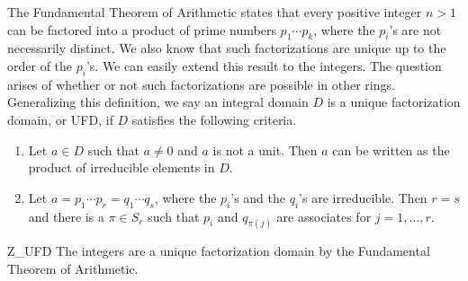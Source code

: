 
 
 
The Fundamental Theorem of Arithmetic states that every positive
integer $n >1$ can be factored into a product of prime numbers $p_1
\cdots p_k$, where the $p_i$'s are not necessarily distinct. We also
know that such factorizations are unique up to the order of the
$p_i$'s. We can easily extend this result to the integers. The
question arises of whether or not such factorizations are possible in
other rings.  Generalizing this definition, we say an integral domain
$D$ is a {\bfi unique factorization domain}, or {\bfi
UFD}, if $D$ satisfies the following criteria.  
\begin{enumerate}
 
\item
Let $a \in D$ such that $a \neq 0$ and $a$ is not a unit.
Then $a$ can be written as the product of irreducible
elements in $D$.
 
\item %
Let $a = p_1 \cdots p_r = q_1 \cdots q_s$, where the $p_i$'s and the
$q_i$'s are irreducible. Then $r=s$ and there is a $\pi \in S_r$ such
that $p_i$ and $q_{\pi(j)}$ are associates for \mbox{$j = 1, \ldots, r$}. 
 
\end{enumerate}


\begin{example}{Z_UFD}
The integers are a unique factorization domain by the Fundamental
Theorem of Arithmetic.
\end{example}
 


